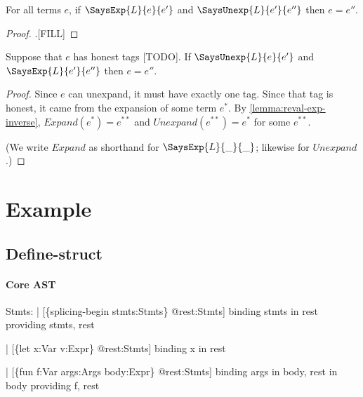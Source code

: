 \begin{lemma} \label{lemma:reval-exp-inverse}
  For all terms $e$, if $\SaysExp{L}{e}{e'}$ and
  $\SaysUnexp{L}{e'}{e''}$ then $e = e''$.
\end{lemma}
\begin{proof}
  .[FILL]
\end{proof}
\begin{corollary}
  Suppose that $e$ has honest tags [TODO].
  If $\SaysUnexp{L}{e}{e'}$ and $\SaysExp{L}{e'}{e''}$
  then $e = e''$.
\end{corollary}
\begin{proof}
  Since $e$ can unexpand, it must have exactly one tag.
  Since that tag is honest, it came from the expansion of some term $e^{*}$.
  By \cref{lemma:reval-exp-inverse}, $Expand(e^{*}) = e^{**}$ 
  and $Unexpand(e^{**}) = e^{*}$ for some $e^{**}$.

  (We write $Expand$ as shorthand for $\SaysExp{L}{\_}{\_}$;
   likewise for $Unexpand$.)
\end{proof}



\newpage
\section{Example}

\subsection{Define-struct}

\paragraph{Core AST}
\begin{Codes}
Stmts:
| [\{splicing-begin stmts:Stmts\} @rest:Stmts]
   binding stmts in rest
   providing stmts, rest

| [\{let x:Var v:Expr\} @rest:Stmts]
   binding x in rest

| [\{fun f:Var args:Args body:Expr\} @rest:Stmts]
   binding args in body, rest in body
   providing f, rest
\end{Codes}





